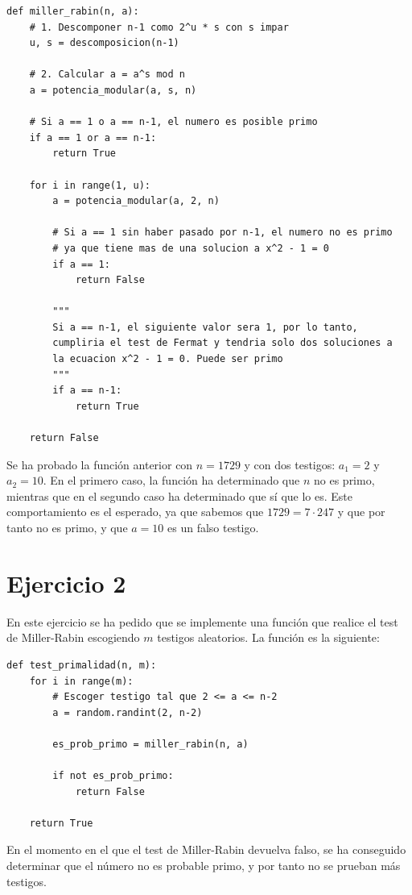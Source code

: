 \documentclass[11pt,a4paper]{article}
\newcommand{\nonumsection}[1]{\section*{#1}\addcontentsline{toc}{section}{#1}}
\begin{document}
\begin{lstlisting}
def miller_rabin(n, a):
    # 1. Descomponer n-1 como 2^u * s con s impar
    u, s = descomposicion(n-1)
    
    # 2. Calcular a = a^s mod n
    a = potencia_modular(a, s, n)
    
    # Si a == 1 o a == n-1, el numero es posible primo
    if a == 1 or a == n-1:
        return True
    
    for i in range(1, u):
        a = potencia_modular(a, 2, n)
        
        # Si a == 1 sin haber pasado por n-1, el numero no es primo
        # ya que tiene mas de una solucion a x^2 - 1 = 0
        if a == 1:
            return False
        
        """
        Si a == n-1, el siguiente valor sera 1, por lo tanto,
        cumpliria el test de Fermat y tendria solo dos soluciones a
        la ecuacion x^2 - 1 = 0. Puede ser primo
        """
        if a == n-1:
            return True
    
    return False
\end{lstlisting}

Se ha probado la función anterior con $n = 1729$ y con dos testigos: $a_1 = 2$ y $a_2 = 10$.
En el primero caso, la función ha determinado que $n$ no es primo, mientras que en el segundo
caso ha determinado que sí que lo es. Este comportamiento es el esperado, ya que sabemos que
$1729 = 7 \cdot 247$ y que por tanto no es primo, y que $a = 10$ es un falso testigo.

\nonumsection{Ejercicio 2}

En este ejercicio se ha pedido que se implemente una función que realice el test de Miller-Rabin
escogiendo $m$ testigos aleatorios. La función es la siguiente:

\begin{lstlisting}
def test_primalidad(n, m):
    for i in range(m):
        # Escoger testigo tal que 2 <= a <= n-2
        a = random.randint(2, n-2)
        
        es_prob_primo = miller_rabin(n, a)
        
        if not es_prob_primo:
            return False
    
    return True
\end{lstlisting}

En el momento en el que el test de Miller-Rabin devuelva falso, se ha conseguido determinar
que el número no es probable primo, y por tanto no se prueban más testigos.
\end{document}
